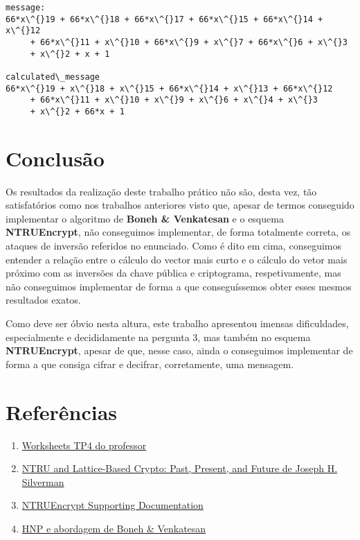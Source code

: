 \documentclass[11pt]{article}
\providecommand{\tightlist}{%
      \setlength{\itemsep}{0pt}\setlength{\parskip}{0pt}}
\begin{document}
    \begin{Verbatim}[commandchars=\\\{\}]
message:
66*x\^{}19 + 66*x\^{}18 + 66*x\^{}17 + 66*x\^{}15 + 66*x\^{}14 + x\^{}12
     + 66*x\^{}11 + x\^{}10 + 66*x\^{}9 + x\^{}7 + 66*x\^{}6 + x\^{}3
     + x\^{}2 + x + 1

calculated\_message
66*x\^{}19 + x\^{}18 + x\^{}15 + 66*x\^{}14 + x\^{}13 + 66*x\^{}12 
     + 66*x\^{}11 + x\^{}10 + x\^{}9 + x\^{}6 + x\^{}4 + x\^{}3
     + x\^{}2 + 66*x + 1

    \end{Verbatim}

    \hypertarget{conclusuxe3o}{%
\section{Conclusão}\label{conclusuxe3o}}

    Os resultados da realização deste trabalho prático não são, desta vez,
tão satisfatórios como nos trabalhos anteriores visto que, apesar de
termos conseguido implementar o algoritmo de \textbf{Boneh \&
Venkatesan} e o esquema \textbf{NTRUEncrypt}, não conseguimos
implementar, de forma totalmente correta, os ataques de inversão
referidos no enunciado. Como é dito em cima, conseguimos entender a
relação entre o cálculo do vector mais curto e o cálculo do vetor mais
próximo com as inversões da chave pública e criptograma, respetivamente,
mas não conseguimos implementar de forma a que conseguíssemos obter
esses mesmos resultados exatos.

Como deve ser óbvio nesta altura, este trabalho apresentou imensas
dificuldades, especialmente e decididamente na pergunta 3, mas também no
esquema \textbf{NTRUEncrypt}, apesar de que, nesse caso, ainda o
conseguimos implementar de forma a que consiga cifrar e decifrar,
corretamente, uma mensagem.

    \hypertarget{referuxeancias}{%
\section{Referências}\label{referuxeancias}}

    \begin{enumerate}
\def\labelenumi{\arabic{enumi}.}
\tightlist
\item
  \href{https://www.dropbox.com/sh/f0j9adiaw4v3deb/AADiMJL2SBP8IMjAxA-SxX2Za/WorkSheets/TP4?dl=0\&subfolder_nav_tracking=1}{Worksheets
  TP4 do professor}
\item
  \href{http://archive.dimacs.rutgers.edu/Workshops/Post-Quantum/Slides/Silverman.pdf}{NTRU
  and Lattice-Based Crypto: Past, Present, and Future de Joseph H.
  Silverman}
\item
  \href{https://www.dropbox.com/sh/ejlraszbb4ogbod/AABacbwfTbUKwRPmPfkgEIuIa/NTRUEncrypt/Supporting_Documentation?dl=0\&subfolder_nav_tracking=1}{NTRUEncrypt
  Supporting Documentation}
\item
  \href{https://paper.dropbox.com/doc/Hidden-Number-Problem-HXjSmxuD62Xr6nEXocfjg}{HNP
  e abordagem de Boneh \& Venkatesan}
\end{enumerate}


    
    
    
    
\end{document}
